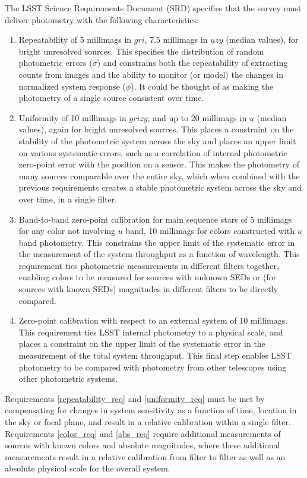 \documentclass[12pt,preprint]{aastex}
\begin{document}
The LSST Science Requirements Document (SRD) specifies that the survey
must deliver photometry with the following characteristics:
\begin{enumerate}
\item{Repeatability of 5 millimags in $gri$, 7.5 millimags in $uzy$ 
    (median values),
for bright unresolved sources.  This specifies the distribution of
random photometric errors ($\sigma$) and constrains both the
repeatability of extracting counts from images and the ability to
monitor (or model) the changes in normalized system response
($\phi$). It could be thought of as making the photometry of a single
source consistent over time. \label{repeatability_req}}
\item{Uniformity of 10 millimags in $grizy$, and up to 20 millimags in
$u$ (median values), again for bright unresolved sources. This places a constraint on
the stability of the photometric system across the sky and places an
upper limit on various systematic errors, such as a correlation of
internal photometric zero-point error with the position on a
sensor. This makes the photometry of many sources comparable over the
entire sky, which when combined with the previous requirements creates
a stable photometric system across the sky and over time, in a single
filter. \label{uniformity_req}}
\item{Band-to-band zero-point calibration for main sequence stars of 5
millimags for any color not involving $u$ band, 10 millimags for
colors constructed with $u$ band photometry. This constrains the upper
limit of the systematic error in the measurement of the system
throughput as a function of wavelength. This requirement ties
photometric measurements in different filters together, enabling
colors to be measured for sources with unknown SEDs or (for sources
with known SEDs) magnitudes in different filters to be directly
compared. \label{color_req}}
\item{Zero-point calibration with respect to an external system of 10
millimags. This requirement ties LSST internal photometry to a
physical scale, and places a constraint on the upper limit of the
systematic error in the measurement of the total system
throughput. This final step enables LSST photometry to be compared
with photometry from other telescopes using other photometric
systems. \label{abs_req}}
\end{enumerate}

Requirements \ref{repeatability_req} and \ref{uniformity_req} must be
met by compensating for changes in system sensitivity as a function of
time, location in the sky or focal plane, and result in a relative
calibration within a single filter. Requirements \ref{color_req}
and \ref{abs_req} require additional measurements of sources with
known colors and absolute magnitudes, where these additional
measurements result in a relative calibration from filter to filter as
well as an absolute physical scale for the overall system.
\end{document}
